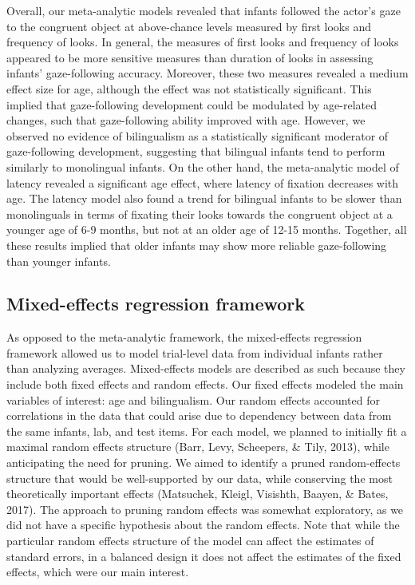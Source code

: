 \documentclass[,man,floatsintext]{apa6}
\begin{document}
Overall, our meta-analytic models revealed that infants followed the actor's gaze to the congruent object at above-chance levels measured by first looks and frequency of looks. In general, the measures of first looks and frequency of looks appeared to be more sensitive measures than duration of looks in assessing infants' gaze-following accuracy. Moreover, these two measures revealed a medium effect size for age, although the effect was not statistically significant. This implied that gaze-following development could be modulated by age-related changes, such that gaze-following ability improved with age. However, we observed no evidence of bilingualism as a statistically significant moderator of gaze-following development, suggesting that bilingual infants tend to perform similarly to monolingual infants. On the other hand, the meta-analytic model of latency revealed a significant age effect, where latency of fixation decreases with age. The latency model also found a trend for bilingual infants to be slower than monolinguals in terms of fixating their looks towards the congruent object at a younger age of 6-9 months, but not at an older age of 12-15 months. Together, all these results implied that older infants may show more reliable gaze-following than younger infants.

\hypertarget{mixed-effects-regression-framework}{%
\subsection{Mixed-effects regression framework}\label{mixed-effects-regression-framework}}

As opposed to the meta-analytic framework, the mixed-effects regression framework allowed us to model trial-level data from individual infants rather than analyzing averages. Mixed-effects models are described as such because they include both fixed effects and random effects. Our fixed effects modeled the main variables of interest: age and bilingualism. Our random effects accounted for correlations in the data that could arise due to dependency between data from the same infants, lab, and test items. For each model, we planned to initially fit a maximal random effects structure (Barr, Levy, Scheepers, \& Tily, 2013), while anticipating the need for pruning. We aimed to identify a pruned random-effects structure that would be well-supported by our data, while conserving the most theoretically important effects (Matsuchek, Kleigl, Visishth, Baayen, \& Bates, 2017). The approach to pruning random effects was somewhat exploratory, as we did not have a specific hypothesis about the random effects. Note that while the particular random effects structure of the model can affect the estimates of standard errors, in a balanced design it does not affect the estimates of the fixed effects, which were our main interest.
\end{document}
